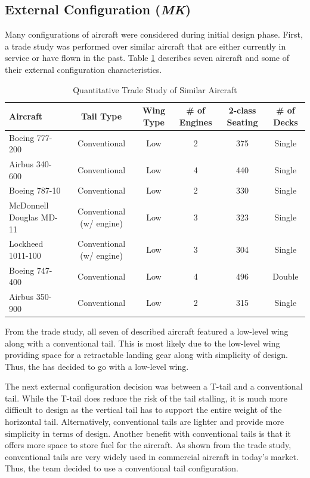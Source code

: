 
\subsection{External Configuration  (\textit{MK})}
Many configurations of aircraft were considered during initial design phase. First, a trade study was performed over similar aircraft that are either currently in service or have flown in the past. Table \ref{tabmk1} describes seven aircraft and some of their external configuration characteristics. 

\begin{table}[H]
    \centering
    \caption{Quantitative Trade Study of Similar Aircraft}
    \begin{tabular}{|m{3cm}||c|c|c|c|c|}
    \toprule
    \label{tabmk1}
    \textbf{Aircraft} & \textbf{Tail Type} & \textbf{Wing Type} & \textbf{\# of Engines} & \textbf{2-class Seating} & \textbf{\# of Decks} \\
    \hline\hline
    Boeing 777-200 & Conventional & Low & 2 & 375 & Single \\
    \hline
    Airbus 340-600 & Conventional & Low & 4 & 440 & Single \\
    \hline
    Boeing 787-10 & Conventional & Low & 2 & 330 & Single \\
    \hline
    McDonnell Douglas MD-11 & Conventional (w/ engine) & Low & 3 & 323 & Single \\
    \hline
    Lockheed 1011-100 & Conventional (w/ engine) & Low & 3 & 304 & Single \\
    \hline
    Boeing 747-400 & Conventional & Low & 4 & 496 & Double \\
    \hline
    Airbus 350-900 & Conventional & Low & 2 & 315 & Single \\
    \bottomrule
    \end{tabular}
\end{table}

From the trade study, all seven of described aircraft featured a low-level wing along with a conventional tail. This is most likely due to the low-level wing providing space for a retractable landing gear along with simplicity of design. Thus, the has decided to go with a low-level wing.

The next external configuration decision was between a T-tail and a conventional tail. While the T-tail does reduce the risk of the tail stalling, it is much more difficult to design as the vertical tail has to support the entire weight of the horizontal tail. Alternatively, conventional tails are lighter and provide more simplicity in terms of design. Another benefit with conventional tails is that it offers more space to store fuel for the aircraft. As shown from the trade study, conventional tails are very widely used in commercial aircraft in today's market. Thus, the team decided to use a conventional tail configuration. 

